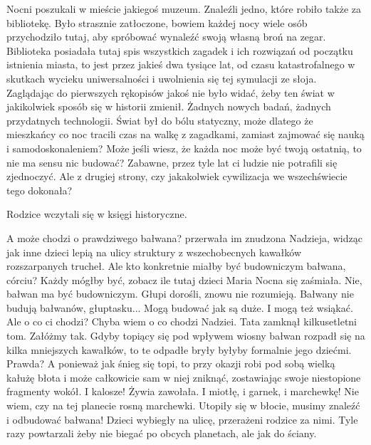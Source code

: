 
Nocni poszukali w mieście jakiegoś muzeum.
Znaleźli jedno, które robiło także za bibliotekę.
Było strasznie zatłoczone, bowiem każdej nocy wiele osób przychodziło tutaj, aby spróbować wynaleźć swoją własną broń na zegar.
Biblioteka posiadała tutaj spis wszystkich zagadek i ich rozwiązań od początku istnienia miasta, to jest przez jakieś dwa tysiące lat, od czasu katastrofalnego w skutkach wycieku uniwersalności i uwolnienia się tej symulacji ze słoja.
Zaglądając do pierwszych rękopisów jakoś nie było widać, żeby ten świat w jakikolwiek sposób się w historii zmienił. 
Żadnych nowych badań, żadnych przydatnych technologii.
Świat był do bólu statyczny, może dlatego że mieszkańcy co noc tracili czas na walkę z zagadkami, zamiast zajmować się nauką i samodoskonaleniem?
Może jeśli wiesz, że każda noc może być twoją ostatnią, to nie ma sensu nic budować?
Zabawne, przez tyle lat ci ludzie nie potrafili się zjednoczyć.
Ale z drugiej strony, czy jakakolwiek cywilizacja we wszechświecie tego dokonała?

Rodzice wczytali się w księgi historyczne.
\begin{dialogue}
	\ds{} A może chodzi o prawdziwego bałwana? \dm{} przerwała im znudzona Nadzieja, widząc jak inne dzieci lepią na ulicy struktury z wszechobecnych kawałków rozszarpanych trucheł.
	\ds{} Ale kto konkretnie miałby być budowniczym bałwana, córciu? Każdy mógłby być, zobacz ile tutaj dzieci \dm{} Maria Nocna się zaśmiała.
	\ds{} Nie, bałwan ma być budowniczym.
		\dm{} Głupi dorośli, znowu nie rozumieją.
	\ds{} Bałwany nie budują bałwanów, głuptasku...
	\ds{} Mogą budować jak są duże. I mogą też wsiąkać.
	\ds{} Ale o co ci chodzi?
	\ds{} Chyba wiem o co chodzi Nadziei. 
		\dm{} Tata zamknął kilkusetletni tom. 
		\dm{} Załóżmy tak. Gdyby topiący się pod wpływem wiosny bałwan rozpadł się na kilka mniejszych kawałków, to te odpadłe bryły byłyby formalnie jego dziećmi. Prawda? A ponieważ jak śnieg się topi, to przy okazji robi pod sobą wielką kałużę błota i może całkowicie sam w niej zniknąć, zostawiając swoje niestopione fragmenty wokół.
	\ds{} I kalosze! \dm{} Żywia zawołała. \dm{} I miotłę, i garnek, i marchewkę!
	\ds{} Nie wiem, czy na tej planecie rosną marchewki.
	\ds{} Utopiły się w błocie, musimy znaleźć i odbudować bałwana! \dm{} Dzieci wybiegły na ulicę, przerażeni rodzice za nimi. Tyle razy powtarzali żeby nie biegać po obcych planetach, ale jak do ściany.
\end{dialogue}

